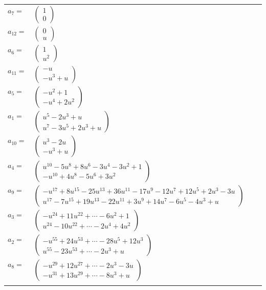 \documentclass[1p]{elsarticle_modified}
\theoremstyle{definition}
\begin{document}
\begin{tabular}{m{7pt} m{180pt} m{7pt} m{180pt} }
\flushright $a_{7}=$&$\begin{pmatrix}1\\0\end{pmatrix}$ \\
\flushright $a_{12}=$&$\begin{pmatrix}0\\u\end{pmatrix}$ \\
\flushright $a_{6}=$&$\begin{pmatrix}1\\u^2\end{pmatrix}$ \\
\flushright $a_{11}=$&$\begin{pmatrix}- u\\- u^3+u\end{pmatrix}$ \\
\flushright $a_{5}=$&$\begin{pmatrix}- u^2+1\\- u^4+2 u^2\end{pmatrix}$ \\
\flushright $a_{1}=$&$\begin{pmatrix}u^5-2 u^3+u\\u^7-3 u^5+2 u^3+u\end{pmatrix}$ \\
\flushright $a_{10}=$&$\begin{pmatrix}u^3-2 u\\- u^3+u\end{pmatrix}$ \\
\flushright $a_{4}=$&$\begin{pmatrix}u^{10}-5 u^8+8 u^6-3 u^4-3 u^2+1\\- u^{10}+4 u^8-5 u^6+3 u^2\end{pmatrix}$ \\
\flushright $a_{9}=$&$\begin{pmatrix}- u^{17}+8 u^{15}-25 u^{13}+36 u^{11}-17 u^9-12 u^7+12 u^5+2 u^3-3 u\\u^{17}-7 u^{15}+19 u^{13}-22 u^{11}+3 u^9+14 u^7-6 u^5-4 u^3+u\end{pmatrix}$ \\
\flushright $a_{3}=$&$\begin{pmatrix}- u^{24}+11 u^{22}+\cdots-6 u^2+1\\u^{24}-10 u^{22}+\cdots-2 u^4+4 u^2\end{pmatrix}$ \\
\flushright $a_{2}=$&$\begin{pmatrix}- u^{55}+24 u^{53}+\cdots-28 u^5+12 u^3\\u^{55}-23 u^{53}+\cdots-2 u^3+u\end{pmatrix}$ \\
\flushright $a_{8}=$&$\begin{pmatrix}- u^{29}+12 u^{27}+\cdots-2 u^3-3 u\\- u^{31}+13 u^{29}+\cdots-8 u^3+u\end{pmatrix}$\\&\end{tabular}
\end{document}
